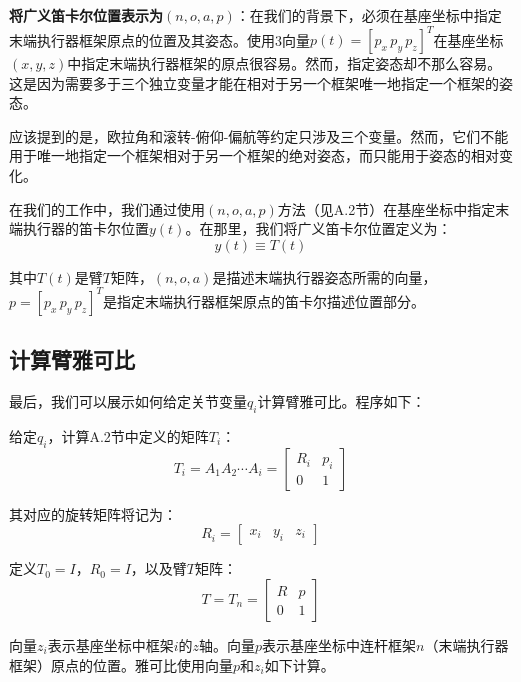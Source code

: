 \documentclass[UTF8,a4paper]{ctexart}
\begin{document}
\textbf{将广义笛卡尔位置表示为$(n, o, a, p)$}：在我们的背景下，必须在基座坐标中指定末端执行器框架原点的位置及其姿态。使用3向量$p(t) = [p_x \, p_y \, p_z]^T$在基座坐标$(x, y, z)$中指定末端执行器框架的原点很容易。然而，指定姿态却不那么容易。这是因为需要多于三个独立变量才能在相对于另一个框架唯一地指定一个框架的姿态。

应该提到的是，欧拉角和滚转-俯仰-偏航等约定只涉及三个变量。然而，它们不能用于唯一地指定一个框架相对于另一个框架的绝对姿态，而只能用于姿态的相对变化。

在我们的工作中，我们通过使用$(n, o, a, p)$方法（见A.2节）在基座坐标中指定末端执行器的笛卡尔位置$y(t)$。在那里，我们将广义笛卡尔位置定义为：
\begin{equation}
y(t) \equiv T(t)
\tag{A.3.13}
\end{equation}

其中$T(t)$是臂$T$矩阵，$(n, o, a)$是描述末端执行器姿态所需的向量，$p = [p_x \, p_y \, p_z]^T$是指定末端执行器框架原点的笛卡尔描述位置部分。

\subsection{计算臂雅可比}

最后，我们可以展示如何给定关节变量$q_i$计算臂雅可比。程序如下：

给定$q_i$，计算A.2节中定义的矩阵$T_i$：
\begin{equation}
T_i = A_1 A_2 \cdots A_i = \begin{bmatrix} R_i & p_i \\ 0 & 1 \end{bmatrix}
\tag{A.3.29}
\end{equation}

其对应的旋转矩阵将记为：
\begin{equation}
R_i = \begin{bmatrix} x_i & y_i & z_i \end{bmatrix}
\tag{A.3.30}
\end{equation}

定义$T_0 = I$，$R_0 = I$，以及臂$T$矩阵：
\begin{equation}
T = T_n = \begin{bmatrix} R & p \\ 0 & 1 \end{bmatrix}
\tag{A.3.31}
\end{equation}

向量$z_i$表示基座坐标中框架$i$的$z$轴。向量$p$表示基座坐标中连杆框架$n$（末端执行器框架）原点的位置。雅可比使用向量$p$和$z_i$如下计算。
\end{document}

